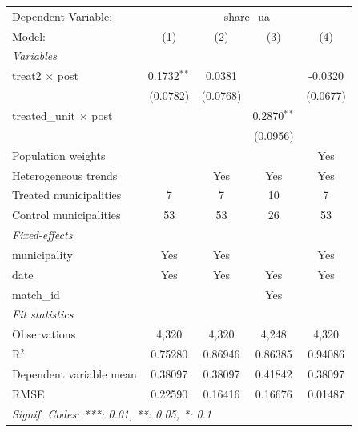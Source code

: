 
\begingroup
\centering
\begin{tabular}{lcccc}
   \tabularnewline \midrule \midrule
   Dependent Variable: & \multicolumn{4}{c}{share\_ua}\\
   Model:                        & (1)           & (2)      & (3)           & (4)\\  
   \midrule
   \emph{Variables}\\
   treat2 $\times$ post          & 0.1732$^{**}$ & 0.0381   &               & -0.0320\\   
                                 & (0.0782)      & (0.0768) &               & (0.0677)\\   
   treated\_unit $\times$ post   &               &          & 0.2870$^{**}$ &   \\   
                                 &               &          & (0.0956)      &   \\   
   Population weights            &               &          &               & Yes\\  
   Heterogeneous trends          &               & Yes      & Yes           & Yes\\  
   Treated municipalities        & 7             & 7        & 10            & 7\\  
   Control municipalities        & 53            & 53       & 26            & 53\\  
   \midrule
   \emph{Fixed-effects}\\
   municipality                  & Yes           & Yes      &               & Yes\\  
   date                          & Yes           & Yes      & Yes           & Yes\\  
   match\_id                     &               &          & Yes           & \\  
   \midrule
   \emph{Fit statistics}\\
   Observations                  & 4,320         & 4,320    & 4,248         & 4,320\\  
   R$^2$                         & 0.75280       & 0.86946  & 0.86385       & 0.94086\\  
   Dependent variable mean       & 0.38097       & 0.38097  & 0.41842       & 0.38097\\  
   RMSE                          & 0.22590       & 0.16416  & 0.16676       & 0.01487\\  
   \midrule \midrule
   \multicolumn{5}{l}{\emph{Signif. Codes: ***: 0.01, **: 0.05, *: 0.1}}\\
\end{tabular}
\par\endgroup


